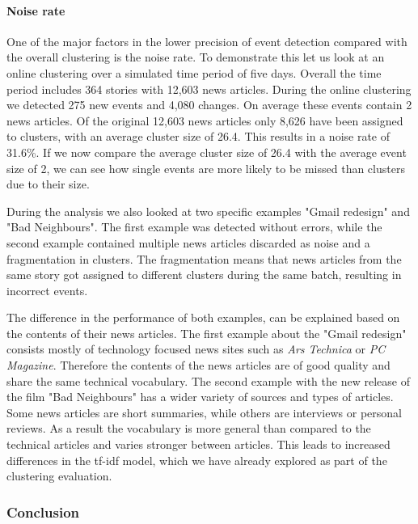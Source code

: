 \paragraph{Noise rate}
One of the major factors in the lower precision of event detection
compared with the overall clustering is the noise rate.
To demonstrate this let us look at an online clustering over a simulated time period of five days.
Overall the time period includes 364 stories with 12,603 news articles.
During the online clustering we detected 275 new events and 4,080 changes.
On average these events contain 2 news articles.
Of the original 12,603 news articles only 8,626 have been assigned to clusters,
with an average cluster size of 26.4.
This results in a noise rate of 31.6\%.
If we now compare the average cluster size of 26.4 with the average event size of 2,
we can see how single events are more likely to be missed than clusters due to their size.

During the analysis we also looked at two specific examples "Gmail redesign" and "Bad Neighbours".
The first example was detected without errors,
while the second example contained multiple news articles discarded as noise and a fragmentation in clusters.
The fragmentation means that news articles from the same story got assigned to different clusters during the same batch,
resulting in incorrect events.

The difference in the performance of both examples, can be explained based on the contents of their news articles.
The first example about the "Gmail redesign" consists mostly of technology focused news sites
such as \textit{Ars Technica} or \textit{PC Magazine}.
Therefore the contents of the news articles are of good quality and share the same technical vocabulary.
The second example with the new release of the film "Bad Neighbours"
has a wider variety of sources and types of articles.
Some news articles are short summaries, while others are interviews or personal reviews.
As a result the vocabulary is more general than compared to the technical articles and varies stronger between articles.
This leads to increased differences in the tf-idf model,
which we have already explored as part of the clustering evaluation.

\subsubsection{Conclusion}
\label{subsubsec:5b_conclusion}

